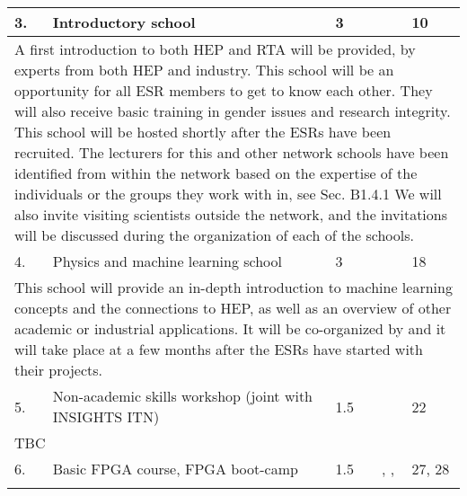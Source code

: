 \begin{center}
{\begin{tabular}{@{}lp{56mm}p{7mm}p{40mm}p{20mm}@{}}
			    
				\cellcolor{lime} 3. & Introductory school & 3 & \nikhefentity & 10  \tabularnewline\hline%
				
			    \multicolumn{5}{p{\textwidth}}{
			    
			    A first introduction to both HEP and RTA will be provided, by experts from both HEP and industry. 
			    This school will be an opportunity for all ESR members to get to know each other. 
			    They will also receive basic training in gender issues and research integrity. 
			    This school will be hosted shortly after the ESRs have been recruited. The lecturers for this and other
			    network schools have been identified from within the network based on
			    the expertise of the individuals or the groups they work with in, see Sec. B1.4.1%
			    We will also invite visiting scientists outside the network, and the invitations will be discussed during the organization of each of the schools.   
			    } \tabularnewline \hline\midrule
			    
			    
				\cellcolor{orange} 4. & Physics and machine learning school & 3 & \unigeentity & 18 \tabularnewline\hline
				
				\multicolumn{5}{p{\textwidth}}{
				
				 This school will provide an in-depth introduction to machine learning concepts and the connections to HEP, as well as an overview of other academic or industrial applications. 
				 It will be co-organized by \yandex and it will take place at \unige a few months after the ESRs have started with their projects. 
				 
			    } \tabularnewline \hline\midrule
			    
			    
			    \cellcolor{green} 5. & Non-academic skills workshop (joint with INSIGHTS ITN) & 1.5 & \heidelbergentity  & 22 \tabularnewline \hline
				
				\multicolumn{5}{p{\textwidth}}{		
							
				TBC
			    } \tabularnewline \hline\midrule	
			    
			    
				\cellcolor{yellow} 6. & Basic FPGA course, FPGA boot-camp & 1.5 & \cernentity, \ohioentity, \pisaentity & 27, 28 \tabularnewline\hline
				
				\multicolumn{5}{p{\textwidth}}{				
				
}
\end{tabular}}
\end{center}
